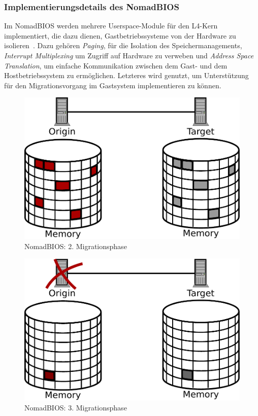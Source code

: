 \subsubsection{Implementierungsdetails des NomadBIOS}
\label{sec:impl-des-nomadb}
Im NomadBIOS werden mehrere Userspace-Module für den L4-Kern
implementiert, die dazu dienen, Gastbetriebssysteme von der Hardware
zu isolieren~\cite{hansen2002nomadic}. Dazu gehören \emph{Paging}, für
die Isolation des Speichermanagements, \emph{Interrupt Multiplexing}
um Zugriff auf Hardware zu verweben und \emph{Address Space
  Translation}, um einfache Kommunikation zwischen dem Gast- und dem
Hostbetriebssystem zu ermöglichen. Letzteres wird genutzt, um
Unterstützung für den Migrationsvorgang im Gastsystem implementieren
zu können.

\begin{figure}[htbp]
  \centering
  \includegraphics[width=0.7\linewidth]{images/nomad_stage2}
  \caption{NomadBIOS: 2. Migrationsphase}
  \label{fig:nomad_stage2}
\end{figure}
\begin{figure}[b]
  \centering
  \includegraphics[width=0.7\linewidth]{images/nomad_stage3}
  \caption{NomadBIOS: 3. Migrationsphase}
  \label{fig:nomad_stage3}
\end{figure}

